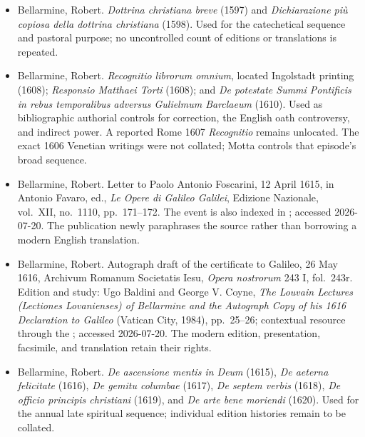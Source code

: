 \begin{itemize}
\item Bellarmine, Robert.  \emph{Dottrina christiana breve} (1597) and
\emph{Dichiarazione più copiosa della dottrina christiana} (1598).  Used for
the catechetical sequence and pastoral purpose; no uncontrolled count of
editions or translations is repeated.

\item Bellarmine, Robert.  \emph{Recognitio librorum omnium}, located
Ingolstadt printing (1608); \emph{Responsio Matthaei Torti} (1608); and
\emph{De potestate Summi Pontificis in rebus temporalibus adversus
Gulielmum Barclaeum} (1610).  Used as bibliographic authorial controls for
correction, the English oath controversy, and indirect power.  A reported Rome
1607 \emph{Recognitio} remains unlocated.  The exact 1606 Venetian writings
were not collated; Motta controls that episode's broad sequence.

\item Bellarmine, Robert.  Letter to Paolo Antonio Foscarini, 12 April 1615,
in Antonio Favaro, ed., \emph{Le Opere di Galileo Galilei}, Edizione
Nazionale, vol.~XII, no.~1110, pp.~171--172.  The event is also indexed in
; accessed 2026-07-20.  The publication newly
paraphrases the source rather than borrowing a modern English translation.

\item Bellarmine, Robert.  Autograph draft of the certificate to Galileo, 26
May 1616, Archivum Romanum Societatis Iesu, \emph{Opera nostrorum} 243 I,
fol.~243r.  Edition and study: Ugo Baldini and George V. Coyne,
\emph{The Louvain Lectures (Lectiones Lovanienses) of Bellarmine and the
Autograph Copy of his 1616 Declaration to Galileo} (Vatican City, 1984),
pp.~25--26; contextual resource through the
; accessed 2026-07-20.  The modern edition, presentation,
facsimile, and translation retain their rights.

\item Bellarmine, Robert.  \emph{De ascensione mentis in Deum} (1615),
\emph{De aeterna felicitate} (1616), \emph{De gemitu columbae} (1617),
\emph{De septem verbis} (1618), \emph{De officio principis christiani}
(1619), and \emph{De arte bene moriendi} (1620).  Used for the annual late
spiritual sequence; individual edition histories remain to be collated.
\end{itemize}

